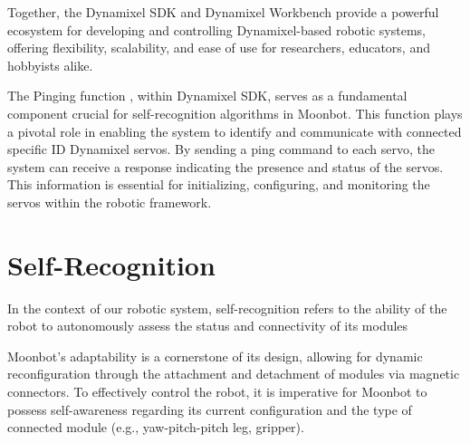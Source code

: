 Together, the Dynamixel SDK and Dynamixel Workbench provide a powerful ecosystem for developing and controlling Dynamixel-based robotic systems, offering flexibility, scalability, and ease of use for researchers, educators, and hobbyists alike.

The Pinging function \cite{dynamixel_sdk_ping_protocol}, within Dynamixel SDK, serves as a fundamental component crucial for self-recognition algorithms in Moonbot. This function plays a pivotal role in enabling the system to identify and communicate with connected specific ID Dynamixel servos. By sending a ping command to each servo, the system can receive a response indicating the presence and status of the servos. This information is essential for initializing, configuring, and monitoring the servos within the robotic framework. 


\section{Self-Recognition}\label{HowToInsertLink}
In the context of our robotic system, self-recognition refers to the ability of the robot to autonomously assess the status and connectivity of its modules

Moonbot's adaptability is a cornerstone of its design, allowing for dynamic reconfiguration through the attachment and detachment of modules via magnetic connectors. To effectively control the robot, it is imperative for Moonbot to possess self-awareness regarding its current configuration and the type of connected module (e.g., yaw-pitch-pitch leg, gripper).

